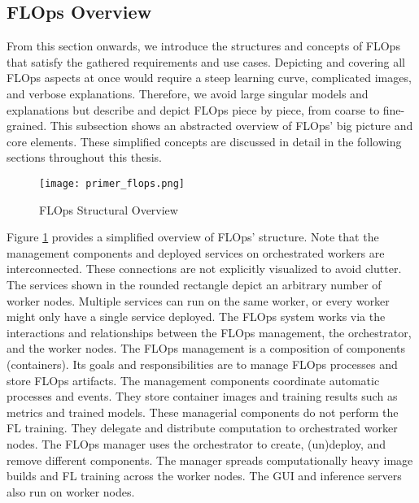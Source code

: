 \subsection{FLOps Overview}\label{subsection:flops_overview}

From this section onwards, we introduce the structures and concepts of FLOps that satisfy the gathered requirements and use cases.
Depicting and covering all FLOps aspects at once would require a steep learning curve, complicated images, and verbose explanations.
Therefore, we avoid large singular models and explanations but describe and depict FLOps piece by piece, from coarse to fine-grained.
This subsection shows an abstracted overview of FLOps' big picture and core elements.
These simplified concepts are discussed in detail in the following sections throughout this thesis.

\begin{figure}[H]
    \begin{adjustwidth}{-0.1\paperwidth}{-0.1\paperwidth}
        \centering
        \texttt{[image: primer\_flops.png]}
        \caption{FLOps Structural Overview}
        \label{fig:flops_structure_overview}
    \end{adjustwidth}
\end{figure}

Figure \ref{fig:flops_structure_overview} provides a simplified overview of FLOps' structure.
Note that the management components and deployed services on orchestrated workers are interconnected.
These connections are not explicitly visualized to avoid clutter.
The services shown in the rounded rectangle depict an arbitrary number of worker nodes.
Multiple services can run on the same worker, or every worker might only have a single service deployed.
The FLOps system works via the interactions and relationships between the FLOps management, the orchestrator, and the worker nodes.
The FLOps management is a composition of components (containers).
Its goals and responsibilities are to manage FLOps processes and store FLOps artifacts.
The management components coordinate automatic processes and events.
They store container images and training results such as metrics and trained models.
These managerial components do not perform the FL training.
They delegate and distribute computation to orchestrated worker nodes.
The FLOps manager uses the orchestrator to create, (un)deploy, and remove different components.
The manager spreads computationally heavy image builds and FL training across the worker nodes.
The GUI and inference servers also run on worker nodes.

